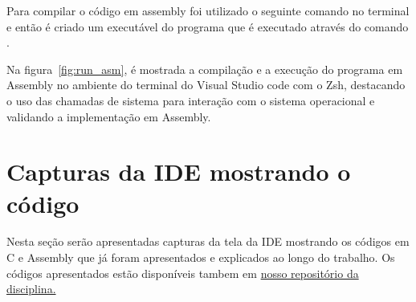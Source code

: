 \documentclass[
	12pt,				%
	openright,			%
	oneside,			%
	a4paper,			%
	chapter=TITLE,		%
	english,			%
	french,				%
	spanish,			%
	brazil				%
	]{abntex2}
\theoremstyle{definition}
\begin{document}

Para compilar o código em assembly foi utilizado o seguinte comando no terminal 
e então é criado um executável do programa que é executado através do comando .
 
Na figura~\ref{fig:run_asm}, é mostrada a compilação e a execução do programa em 
Assembly no ambiente do terminal do Visual Studio code com o Zsh, destacando o uso das chamadas de sistema para 
interação com o sistema operacional e validando a implementação em Assembly.

\section{Capturas da IDE mostrando o código}

Nesta seção serão apresentadas capturas da tela da IDE mostrando os códigos em C e 
Assembly que já foram apresentados e explicados ao longo do trabalho. Os códigos 
apresentados estão disponíveis tambem em 
\href{https://github.com/jvictorferreira3301/Sistemas_Operacionais}{nosso repositório da disciplina.}
\end{document}
